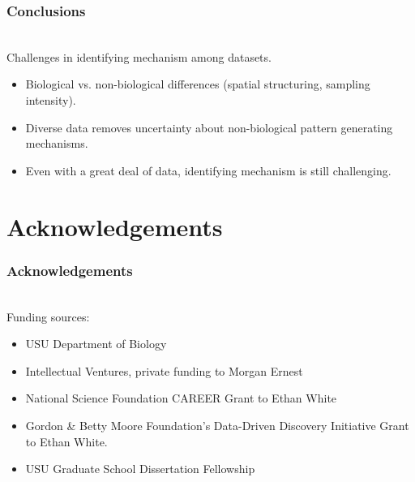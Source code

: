 \documentclass[14pt]{beamer}
\begin{document}
\begin{frame}[t]{}
\frametitle{Conclusions}\
~\\ 
Challenges in identifying mechanism among datasets.
~\\ 
\begin{itemize}
\item Biological vs. non-biological differences (spatial structuring, sampling intensity).
\item Diverse data removes uncertainty about non-biological pattern generating mechanisms.
\item Even with a great deal of data, identifying mechanism is still challenging.
\end{itemize} 
\end{frame}


\section{Acknowledgements}
\begin{frame}[t]{}
\frametitle{Acknowledgements}
~\\ %
\small{Funding sources:}
\begin{small}
\begin{itemize}
\item USU Department of Biology
\item Intellectual Ventures, private funding to Morgan Ernest
\item National Science Foundation CAREER Grant to Ethan White
\item Gordon \& Betty Moore Foundation's Data-Driven Discovery Initiative Grant to Ethan White.
\item USU Graduate School Dissertation Fellowship
\end{itemize}
\end{small}
\end{frame}
\end{document}
